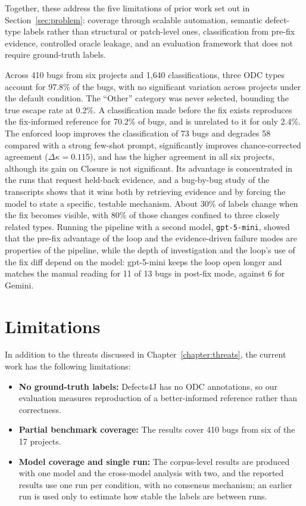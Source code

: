 \documentclass{iutbscthesis}
\begin{document}
Together, these address the five limitations of prior work set out in Section~\ref{sec:problem}: coverage through scalable automation, semantic defect-type labels rather than structural or patch-level ones, classification from pre-fix evidence, controlled oracle leakage, and an evaluation framework that does not require ground-truth labels.

Across 410 bugs from six projects and 1{,}640 classifications, three ODC types account for 97.8\% of the bugs, with no significant variation across projects under the default condition. The ``Other'' category was never selected, bounding the true escape rate at 0.2\%. A classification made before the fix exists reproduces the fix-informed reference for 70.2\% of bugs, and is unrelated to it for only 2.4\%. The enforced loop improves the classification of 73 bugs and degrades 58 compared with a strong few-shot prompt, significantly improves chance-corrected agreement ($\Delta\kappa = 0.115$), and has the higher agreement in all six projects, although its gain on Closure is not significant. Its advantage is concentrated in the runs that request held-back evidence, and a bug-by-bug study of the transcripts shows that it wins both by retrieving evidence and by forcing the model to state a specific, testable mechanism. About 30\% of labels change when the fix becomes visible, with 80\% of those changes confined to three closely related types. Running the pipeline with a second model, \texttt{gpt-5-mini}, showed that the pre-fix advantage of the loop and the evidence-driven failure modes are properties of the pipeline, while the depth of investigation and the loop's use of the fix diff depend on the model: gpt-5-mini keeps the loop open longer and matches the manual reading for 11 of 13 bugs in post-fix mode, against 6 for Gemini.

\section{Limitations}

In addition to the threats discussed in Chapter~\ref{chapter:threats}, the current work has the following limitations:

\begin{itemize}
    \item \textbf{No ground-truth labels:} Defects4J has no ODC annotations, so our evaluation measures reproduction of a better-informed reference rather than correctness.
    \item \textbf{Partial benchmark coverage:} The results cover 410 bugs from six of the 17 projects.
    \item \textbf{Model coverage and single run:} The corpus-level results are produced with one model and the cross-model analysis with two, and the reported results use one run per condition, with no consensus mechanism; an earlier run is used only to estimate how stable the labels are between runs.
\end{itemize}
\end{document}
